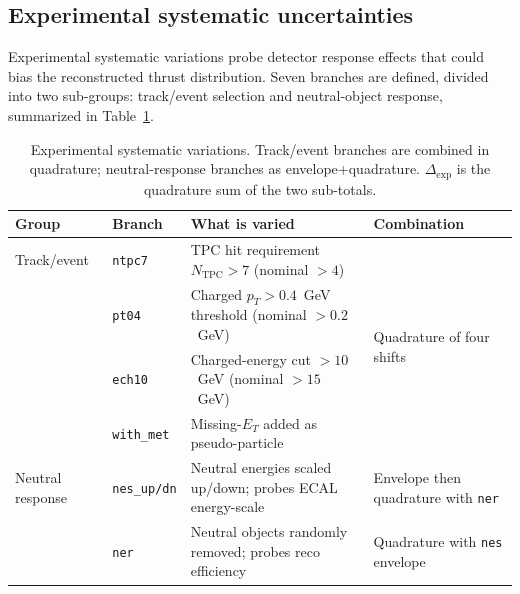 \FloatBarrier

\subsection{Experimental systematic uncertainties}
\label{sec:exp_systematics}

Experimental systematic variations probe detector response effects that could
bias the reconstructed thrust distribution. Seven branches are defined, divided
into two sub-groups: track/event selection and neutral-object response,
summarized in Table~\ref{tab:exp_systematics}.

\begin{table}[t!]
\centering
\small
\begin{tabularx}{0.97\textwidth}{p{}p{}p{}p{}}
\hline
Group & Branch & What is varied & Combination \\
\hline
Track/event & \texttt{ntpc7}
  & TPC hit requirement $N_{\mathrm{TPC}}>7$ (nominal $>4$)
  & \multirow{4}{=}{Quadrature of four shifts} \\[2pt]
 & \texttt{pt04}
  & Charged $p_T>0.4$~GeV threshold (nominal $>0.2$~GeV)
  & \\[2pt]
 & \texttt{ech10}
  & Charged-energy cut $>10$~GeV (nominal $>15$~GeV)
  & \\[2pt]
 & \texttt{with\_met}
  & Missing-$E_T$ added as pseudo-particle
  & \\[6pt]
\hline
Neutral response & \texttt{nes\_up/dn}
  & Neutral energies scaled up/down; probes ECAL energy-scale
  & Envelope then quadrature with \texttt{ner} \\[2pt]
 & \texttt{ner}
  & Neutral objects randomly removed; probes reco efficiency
  & Quadrature with \texttt{nes} envelope \\[2pt]
\hline
\end{tabularx}
\normalsize
\caption{Experimental systematic variations. Track/event branches are combined in
quadrature; neutral-response branches as envelope+quadrature.
$\Delta_{\mathrm{exp}}$ is the quadrature sum of the two sub-totals.}
\label{tab:exp_systematics}
\end{table}

